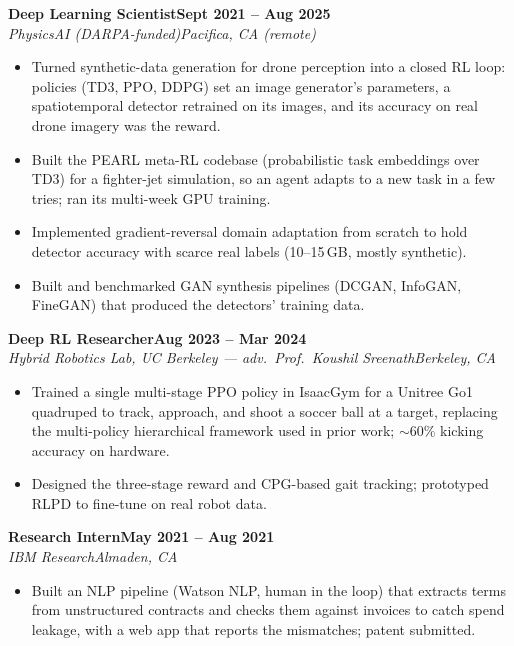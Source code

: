 \documentclass[10pt]{article}
\newcommand{\role}[4]{\textbf{#1}\hfill\textbf{#2}\\\textit{#3}\hfill\textit{#4}}
\begin{document}
\role{Deep Learning Scientist}{Sept 2021 -- Aug 2025}{PhysicsAI (DARPA-funded)}{Pacifica, CA (remote)}
\begin{itemize}
\item Turned synthetic-data generation for drone perception into a closed RL loop: policies (TD3, PPO, DDPG) set an image generator's parameters, a spatiotemporal detector retrained on its images, and its accuracy on real drone imagery was the reward.
\item Built the PEARL meta-RL codebase (probabilistic task embeddings over TD3) for a fighter-jet simulation, so an agent adapts to a new task in a few tries; ran its multi-week GPU training.
\item Implemented gradient-reversal domain adaptation from scratch to hold detector accuracy with scarce real labels (10--15\,GB, mostly synthetic).
\item Built and benchmarked GAN synthesis pipelines (DCGAN, InfoGAN, FineGAN) that produced the detectors' training data.
\end{itemize}

\role{Deep RL Researcher}{Aug 2023 -- Mar 2024}{Hybrid Robotics Lab, UC Berkeley --- adv.\ Prof.\ Koushil Sreenath}{Berkeley, CA}
\begin{itemize}
\item Trained a single multi-stage PPO policy in IsaacGym for a Unitree Go1 quadruped to track, approach, and shoot a soccer ball at a target, replacing the multi-policy hierarchical framework used in prior work; $\sim$60\% kicking accuracy on hardware.
\item Designed the three-stage reward and CPG-based gait tracking; prototyped RLPD to fine-tune on real robot data.
\end{itemize}

\role{Research Intern}{May 2021 -- Aug 2021}{IBM Research}{Almaden, CA}
\begin{itemize}
\item Built an NLP pipeline (Watson NLP, human in the loop) that extracts terms from unstructured contracts and checks them against invoices to catch spend leakage, with a web app that reports the mismatches; patent submitted.
\end{itemize}
\end{document}

